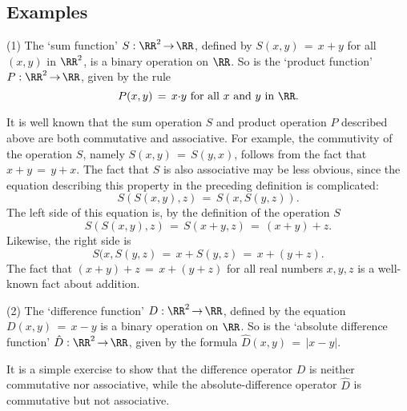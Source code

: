 {\V
\V


        \subsection{\small{{\bf Examples}}}
        \label{ExampA60.20}

\V

        (1) The `sum function' $S:{\RR}^{2} \,{\rightarrow}\, {\RR}$,
    defined by $S(x,y) \,=\, x+y$ for all $(x,y)$ in ${\RR}^{2}$, is a binary operation on ${\RR}$.
    So is the `product function' $P:{\RR}^{2} \,{\rightarrow}\, {\RR}$, given by the rule 
        \begin{displaymath}
        P(x,y) \,=\, x{\cdot}y \mbox{ for all $x$ and $y$ in ${\RR}$}.
        \end{displaymath}

        It is well known that the sum operation $S$ and product operation $P$ described above are both commutative and associative.
    For example, the commutivity of the operation $S$, namely $S(x,y) \,=\, S(y,x)$, follows from the fact that $x+y \,=\, y+x$.
    The fact that $S$ is also associative may be less obvious, since the equation describing this property in the preceding definition is complicated:
        \begin{displaymath}
        S(S(x,y),z) \,=\, S(x,S(y,z)).
        \end{displaymath}
    The left side of this equation is, by the definition of the operation $S$
        \begin{displaymath}
        S(S(x,y),z) \,=\, S(x+y,z) \,=\, (x+y)+z.
        \end{displaymath}
    Likewise, the right side is
        \begin{displaymath}
        S(x,S(y,z) \,=\, x+S(y,z) \,=\, x+(y+z).
        \end{displaymath}
    The fact that $(x+y) + z \,=\, x+(y+z)$ for all real numbers
    $x,y,z$ is a well-known fact about addition.

\V

       (2) The `difference function' $D:{\RR}^{2} \,{\rightarrow}\, {\RR}$, defined by the equation $D(x,y) \,=\, x-y$ is a binary operation on ${\RR}$.
    So is the `absolute difference function' $\hat{D}:{\RR}^{2} \,{\rightarrow}\, {\RR}$, given by the formula $\hat{D}(x,y) \,=\, |x-y|$.

       It is a simple exercise to show that the difference operator $D$ is neither commutative nor associative,
    while the absolute-difference operator $\hat{D}$ is commutative but not associative.

}
